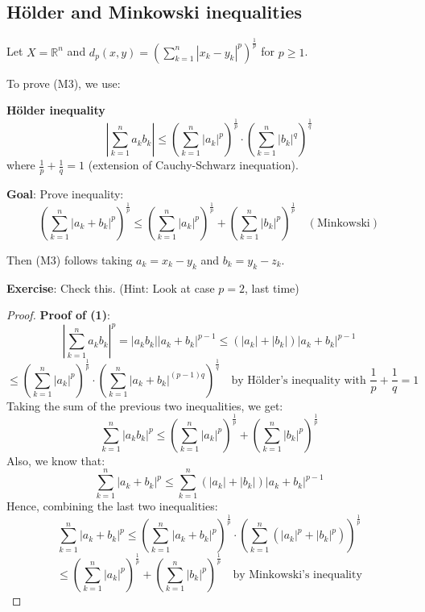 \subsection{Hölder and Minkowski inequalities}
\begin{example}
Let \( X = \mathbb{R}^n \) and \( d_p(x, y) = \left( \sum_{k=1}^{n} |x_k - y_k|^p \right)^{\frac{1}{p}} \) for \( p \geq 1 \).

To prove (M3), we use:

\textbf{Hölder inequality}
\[
\left| \sum_{k=1}^{n} a_k b_k \right| \leq \left( \sum_{k=1}^{n} |a_k|^p \right)^{\frac{1}{p}} \cdot \left( \sum_{k=1}^{n} |b_k|^q \right)^{\frac{1}{q}}
\]
where \( \frac{1}{p} + \frac{1}{q} = 1 \) (extension of Cauchy-Schwarz inequation).

\textbf{Goal}: Prove inequality:
\[
\left( \sum_{k=1}^{n} |a_k + b_k|^p \right)^{\frac{1}{p}} \leq \left( \sum_{k=1}^{n} |a_k|^p \right)^{\frac{1}{p}} + \left( \sum_{k=1}^{n} |b_k|^p \right)^{\frac{1}{p}} \quad (\text{Minkowski})
\]

Then (M3) follows taking \( a_k = x_k - y_k \) and \( b_k = y_k - z_k \).

\textbf{Exercise}: Check this. (Hint: Look at case \( p=2 \), last time)

\end{example}
\begin{proof}
\textbf{Proof of (1)}:
\[
\left| \sum_{k=1}^{n} a_k b_k \right|^p = \left| a_k b_k \right| \left| a_k + b_k \right|^{p-1} \leq \left( |a_k| + |b_k| \right) \left| a_k + b_k \right|^{p-1}
\]
\[
\leq \left( \sum_{k=1}^{n} |a_k|^p \right)^{\frac{1}{p}} \cdot \left( \sum_{k=1}^{n} \left| a_k + b_k \right|^{(p-1)q} \right)^{\frac{1}{q}} \quad \text{by Hölder's inequality with } \frac{1}{p} + \frac{1}{q} = 1
\]
Taking the sum of the previous two inequalities, we get:
\[
\sum_{k=1}^{n} |a_k b_k|^p \leq \left( \sum_{k=1}^{n} |a_k|^p \right)^{\frac{1}{p}} + \left( \sum_{k=1}^{n} |b_k|^p \right)^{\frac{1}{p}}
\]
Also, we know that:
\[
\sum_{k=1}^{n} |a_k + b_k|^p \leq \sum_{k=1}^{n} (|a_k| + |b_k|) |a_k + b_k|^{p-1}
\]
Hence, combining the last two inequalities:
\[
\sum_{k=1}^{n} |a_k + b_k|^p \leq \left( \sum_{k=1}^{n} |a_k + b_k|^p \right)^{\frac{1}{p}} \cdot \left( \sum_{k=1}^{n} \left( |a_k|^p + |b_k|^p \right) \right)^{\frac{1}{p}}
\]
\[
\leq \left( \sum_{k=1}^{n} |a_k|^p \right)^{\frac{1}{p}} + \left( \sum_{k=1}^{n} |b_k|^p \right)^{\frac{1}{p}} \quad \text{by Minkowski's inequality}
\]
\end{proof}

